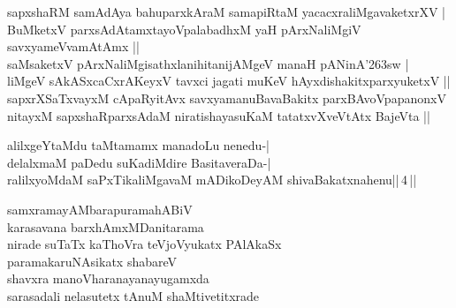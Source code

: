 \begin{entry}
\begin{shl}
sapxshaRM samAdAya bahuparxkAraM samapiRtaM yacacxraliMgavaketxrXV |\\
BuMketxV parxsAdAtamxtayoVpalabadhxM yaH pArxNaliMgiV savxyameVvamAtAmx ||\\
saMsaketxV pArxNaliMgisathxlanihitanijAMgeV manaH pANinA{\char'263}sw |\\
liMgeV sAkASxcaCxrAKeyxV tavxci jagati muKeV hAyxdishakitxparxyuketxV ||\\
sapxrXSaTxvayxM cApaRyitAvx savxyamanuBavaBakitx parxBAvoVpapanonxV\\
nitayxM sapxshaRparxsAdaM niratishayasuKaM tatatxvXveVtAtx BajeVta ||
\end{shl}
\end{entry}

\begin{entry}
\end{entry}

\begin{entry}
\begin{shl}
alilxgeYtaMdu taMtamamx manadoLu nenedu-|\\
delalxmaM paDedu suKadiMdire BasitaveraDa-|\\
ralilxyoMdaM saPxTikaliMgavaM mADikoDeyAM shivaBakatxnahenu||\,4\,||
\end{shl}
\end{entry}

\begin{entry}
\gl{}
\begin{shl}
samxramayAMbarapuramahABiV\\
karasavana barxhAmxMDanitarama\\
nirade suTaTx kaThoVra teVjoVyukatx PAlAkaSx\\
paramakaruNAsikatx shabareV\\
shavxra manoVharanayanayugamxda\\
sarasadali nelasutetx tAnuM shaMtivetitxrade
\end{shl}
\end{entry}

